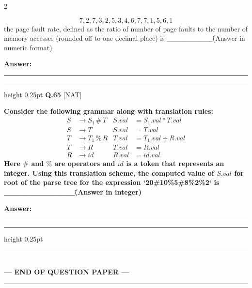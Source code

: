 \documentclass[a4paper,10pt,twoside]{article}
\begin{document}
\begin{multicols}{2}
{\[ 7, 2, 7, 3, 2, 5, 3, 4, 6, 7, 7, 1, 5, 6, 1 \]
the page fault rate, defined as the ratio of number of page faults to the number of memory accesses (rounded off to one decimal place) is \_\_\_\_\_\_\_\_\_\. (Answer in numeric format) \par}
\par\vspace{3pt}\noindent\textbf{Answer:} \rule{3.2cm}{0.4pt}
\par\vspace{6pt}\hrule height 0.25pt\vspace{6pt}
\noindent\textbf{Q.65} \hfill {\footnotesize\textsf{[NAT]}}
\par\vspace{2pt}
{\bfseries Consider the following grammar along with translation rules:
\begin{align*}
S &\to S_1 \,\#\, T & S.val &= S_1.val * T.val \\
S &\to T & S.val &= T.val \\
T &\to T_1 \,\%\, R & T.val &= T_1.val \div R.val \\
T &\to R & T.val &= R.val \\
R &\to id & R.val &= id.val
\end{align*}
Here $\#$ and $\%$ are operators and $id$ is a token that represents an integer. Using this translation scheme, the computed value of $S.val$ for root of the parse tree for the expression `20\#10\%5\#8\%2\%2` is \_\_\_\_\_\_\_\_\_\_\_\_\. (Answer in integer) \par}
\par\vspace{3pt}\noindent\textbf{Answer:} \rule{3.2cm}{0.4pt}
\par\vspace{6pt}\hrule height 0.25pt\vspace{6pt}
\end{multicols}
\vspace{8pt}
\begin{center}
\rule{0.35\linewidth}{0.5pt}\\[2pt]
\textbf{\small --- END OF QUESTION PAPER ---}\\[-8pt]
\rule{0.35\linewidth}{0.5pt}
\end{center}
\vspace{10pt}
\end{document}
